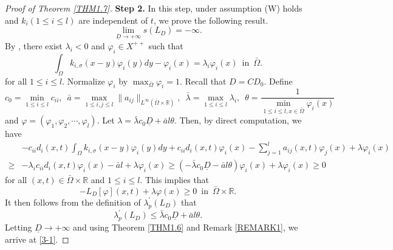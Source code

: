 \documentclass[11pt,reqno]{amsart}
\numberwithin{equation}{section}
\begin{document}
\begin{proof}[Proof of Theorem \ref{THM1.7}]
\textbf{Step 2.} In this step, under assumption {\rm (W)} holds and $k_{i} (1\leq i \leq l)$ are independent of $t$, we prove the following result.
\begin{equation}\label{3-1}
\lim_{ \underline{D} \to +\infty} s(L_{D}) = -\infty.
\end{equation}
By \cite[Theorem 2.1 and Proposition 3.4]{SX1}, there exist $\lambda_{i}<0$ and $\varphi_{i}\in X^{++}$ such that
\begin{equation*}
\int_{\Omega} k_{i,\sigma}(x-y)\varphi_{i}(y)dy-\varphi_{i}(x)
=
\lambda_{i}\varphi_{i}(x)
\enspace\text{in}\enspace \bar\Omega.
\end{equation*}
%
for all $1\leq i \leq l$.
Normalize  $\varphi_{i}$ by $\max_{\bar{\Omega}}\varphi_{i}=1$.
Recall that $D=CD_{0}$.
Define
\begin{equation*}
c_{0} = \min_{1 \leq i\leq l} c_{ii},
\enspace
\bar{a}=\max_{1 \leq i,j\leq l} \| a_{ij} \|_{L^{\infty}(\bar{\Omega}\times \mathbb{R})},
\enspace
\bar\lambda=\max_{ 1\leq i\leq l} \lambda_{i},
\enspace
\theta = \frac{1}{\min_{ 1 \leq i\leq l,x\in \bar{\Omega}} \varphi_{i}(x)}
\end{equation*}
and
$\varphi=(\varphi_{1},\varphi_{2},\cdots,\varphi_{l})$.
Let $\lambda = \bar\lambda c_{0} \underline{D} +  \bar{a} l \theta $.
Then, by direct computation, we have
\begin{align*}
&-c_{ii}d_{i}(x,t) \int_{\Omega} k_{i,\sigma}(x-y)\varphi_{i}(y)dy + c_{ii}d_{i}(x,t)\varphi_{i}(x)-\sum_{j=1}^{l}a_{ij}(x,t)\varphi_{j}(x) + \lambda \varphi_{i}(x)
\\
\geq& -\lambda_{i} c_{ii}d_{i}(x,t) \varphi_{i}(x)  - \bar{a}l + \lambda \varphi_{i}(x)
\geq \left(  -\bar\lambda c_{0}\underline{D} -  \bar{a} l \theta \right)\varphi_{i}(x) + \lambda \varphi_{i}(x)
\geq 0
\end{align*}
for all $(x,t)\in \bar{\Omega}\times \mathbb{R}$ and $1\leq i \leq l$.
This implies that
\begin{equation*}
-L_{D}[\varphi](x,t)+\lambda\varphi(x) \geq 0
\enspace \text{in} \enspace \bar{\Omega}\times \mathbb{R}.
\end{equation*}
It then follows from the definition of $\lambda_{p}^{\prime}(L_{D})$ that
\begin{equation*}
\lambda_{p}^{\prime}(L_{D}) \leq \bar\lambda c_{0} \underline{D} +  \bar{a} l \theta.
\end{equation*}
Letting $\underline{D} \to +\infty$ and using Theorem \ref{THM1.6} and  Remark \ref{REMARK1}, we arrive at \eqref{3-1}.
\end{proof}
\end{document}
